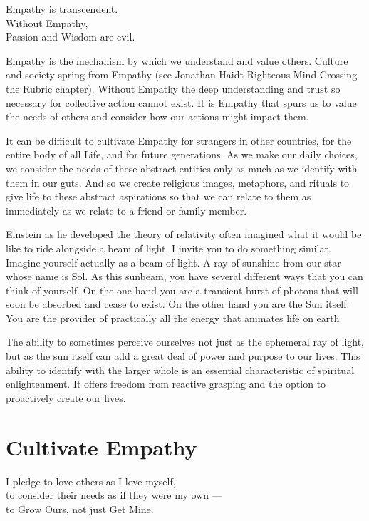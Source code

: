\documentclass[ebook,12pt,openany,twoside]{memoir}
\newcommand{\tab}{\hspace*{2em}}
\begin{document}
\setlength\epigraphwidth{2.8in}
\epigraph{
  Empathy is transcendent.\\
  Without Empathy,\\
  \tab Passion and Wisdom are evil.
}{}

\noindent Empathy is the mechanism by which we understand and value others. Culture and society spring from Empathy (see Jonathan Haidt Righteous Mind
Crossing the Rubric chapter). Without Empathy the deep understanding and trust
so necessary for collective action cannot exist. It is Empathy that spurs us to
value the needs of others and consider how our actions might impact them.

It can be difficult to cultivate Empathy for strangers in other countries, for the entire body of all Life, and for future generations.  As we make our daily choices, we consider the needs of these abstract entities only as much as we identify with them in our guts.
And so we create religious images, metaphors, and rituals to give life to these abstract aspirations so that we can relate to them as immediately as we relate to a friend or family member.

Einstein as he developed the theory of relativity often imagined what
it would be like to ride alongside a beam of light. I invite you to do
something similar. Imagine yourself actually as a beam of light. A ray of
sunshine from our star whose name is Sol. As this sunbeam, you have several
different ways that you can think of yourself. On the one hand you are a
transient burst of photons that will soon be absorbed and cease to exist. On
the other hand you are the Sun itself. You are the provider of practically all
the energy that animates life on earth.

The ability to sometimes perceive ourselves not just as the ephemeral ray of
light, but as the sun itself can add a great deal of power and purpose to our
lives. This ability to identify with the larger whole is an essential
characteristic of spiritual enlightenment. It offers freedom from reactive
grasping and the option to proactively create our lives.





\chapter{Cultivate Empathy}

\setlength\epigraphwidth{2.8in}
\epigraph{
  I pledge to love others as I love myself,\\
  to consider their needs as if they were my own ---\\
  \tab to Grow Ours, not just Get Mine.
}{}
\end{document}
